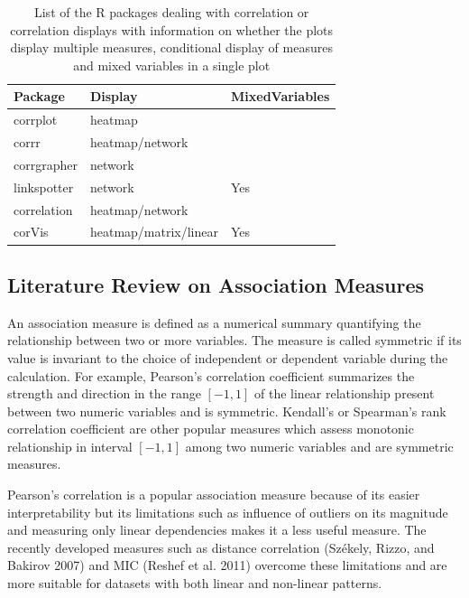\begin{table}

\caption{\label{tab:corrdisplay-packages}List of the R packages dealing with correlation or correlation displays with information on whether the plots display multiple measures, conditional display of measures and mixed variables in a single plot}
\centering
\begin{tabular}[t]{lll}
\toprule
Package & Display & MixedVariables\\
\midrule
corrplot & heatmap & \\
corrr & heatmap/network & \\
corrgrapher & network & \\
linkspotter & network & Yes\\
correlation & heatmap/network & \\
\addlinespace
corVis & heatmap/matrix/linear & Yes\\
\bottomrule
\end{tabular}
\end{table}

\hypertarget{literature-review-on-association-measures}{%
\subsection{Literature Review on Association Measures}\label{literature-review-on-association-measures}}

An association measure is defined as a numerical summary quantifying the relationship between two or more variables. The measure is called symmetric if its value is invariant to the choice of independent or dependent variable during the calculation. For example, Pearson's correlation coefficient summarizes the strength and direction in the range \([-1,1]\) of the linear relationship present between two numeric variables and is symmetric. Kendall's or Spearman's rank correlation coefficient are other popular measures which assess monotonic relationship in interval \([-1,1]\) among two numeric variables and are symmetric measures.

Pearson's correlation is a popular association measure because of its easier interpretability but its limitations such as influence of outliers on its magnitude and measuring only linear dependencies makes it a less useful measure. The recently developed measures such as distance correlation (Székely, Rizzo, and Bakirov 2007) and MIC (Reshef et al. 2011) overcome these limitations and are more suitable for datasets with both linear and non-linear patterns.

